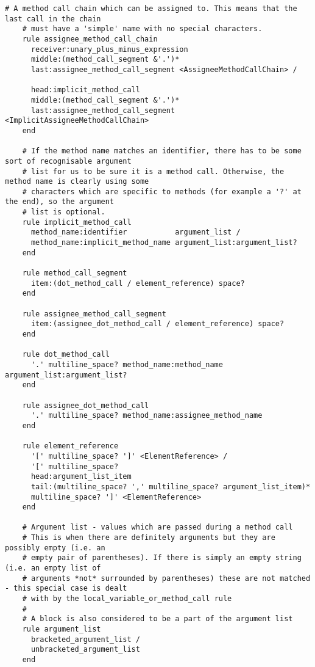 \begin{lstlisting}[title={\small\ttfamily\bfseries parser/language.treetop},language=treetop]
    # A method call chain which can be assigned to. This means that the last call in the chain
    # must have a 'simple' name with no special characters.
    rule assignee_method_call_chain
      receiver:unary_plus_minus_expression
      middle:(method_call_segment &'.')*
      last:assignee_method_call_segment <AssigneeMethodCallChain> /
      
      head:implicit_method_call
      middle:(method_call_segment &'.')*
      last:assignee_method_call_segment <ImplicitAssigneeMethodCallChain>
    end
    
    # If the method name matches an identifier, there has to be some sort of recognisable argument
    # list for us to be sure it is a method call. Otherwise, the method name is clearly using some
    # characters which are specific to methods (for example a '?' at the end), so the argument
    # list is optional.
    rule implicit_method_call
      method_name:identifier           argument_list /
      method_name:implicit_method_name argument_list:argument_list?
    end
    
    rule method_call_segment
      item:(dot_method_call / element_reference) space?
    end
    
    rule assignee_method_call_segment
      item:(assignee_dot_method_call / element_reference) space?
    end
    
    rule dot_method_call
      '.' multiline_space? method_name:method_name argument_list:argument_list?
    end
    
    rule assignee_dot_method_call
      '.' multiline_space? method_name:assignee_method_name
    end
    
    rule element_reference
      '[' multiline_space? ']' <ElementReference> /
      '[' multiline_space?
      head:argument_list_item
      tail:(multiline_space? ',' multiline_space? argument_list_item)*
      multiline_space? ']' <ElementReference>
    end
    
    # Argument list - values which are passed during a method call
    # This is when there are definitely arguments but they are possibly empty (i.e. an
    # empty pair of parentheses). If there is simply an empty string (i.e. an empty list of
    # arguments *not* surrounded by parentheses) these are not matched - this special case is dealt
    # with by the local_variable_or_method_call rule
    #
    # A block is also considered to be a part of the argument list
    rule argument_list
      bracketed_argument_list /
      unbracketed_argument_list
    end
    

\end{lstlisting}
